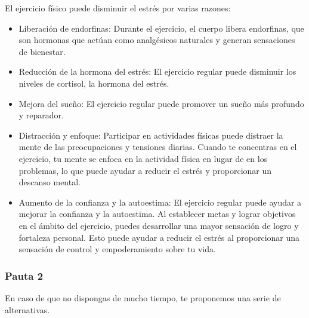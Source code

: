                 El ejercicio físico puede disminuir el estrés por varias razones:
                \begin{itemize}
                    \item Liberación de endorfinas: Durante el ejercicio, el cuerpo libera endorfinas, que son hormonas
                    que  actúan como analgésicos naturales y generan sensaciones de bienestar. 
                    \item Reducción de la hormona del estrés: El ejercicio regular puede disminuir los niveles de 
                    cortisol, la hormona del estrés.
                    \item Mejora del sueño: El ejercicio regular puede promover un sueño más profundo y reparador.
                    \item Distracción y enfoque: Participar en actividades físicas puede distraer la mente de las 
                    preocupaciones y tensiones diarias. Cuando te concentras en el ejercicio, tu mente se enfoca en la 
                    actividad física en lugar de en los problemas, lo que puede ayudar a reducir el estrés y proporcionar 
                    un descanso mental.
                    \item Aumento de la confianza y la autoestima: El ejercicio regular puede ayudar a mejorar la confianza 
                    y la autoestima. Al establecer metas y lograr objetivos en el ámbito del ejercicio, puedes desarrollar 
                    una mayor sensación de logro y fortaleza personal. Esto puede ayudar a reducir el estrés al 
                    proporcionar una sensación de control y empoderamiento sobre tu vida.
                \end{itemize}

            \subsubsection{Pauta 2}
                En caso de que no dispongas de mucho tiempo, te proponemos una serie de alternativas. 

